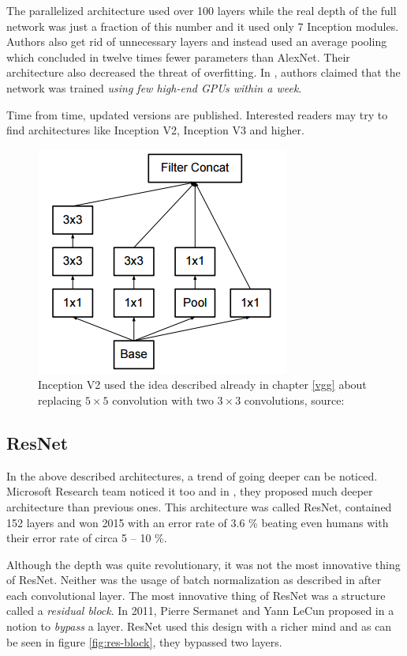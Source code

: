 The parallelized architecture used over 100 layers while the real depth of the full network was just a fraction of this number and it used only 7 Inception modules. Authors also get rid of unnecessary  layers and instead used an average pooling which concluded in twelve times fewer parameters than AlexNet. Their architecture also decreased the threat of overfitting. In \cite{googlenet}, authors claimed that the network was trained \textit{using few high-end GPUs within a week}.

Time from time, updated versions are published. Interested readers may try to find architectures like Inception V2, Inception V3 and higher.

\begin{figure}[H]
   \centering
	\includegraphics[width=0.3\linewidth]{./pictures/inception-v2.png}
	\caption[Inception V2]{Inception V2 used the idea described already in chapter \ref{vgg} about replacing $5 \times 5$ convolution with two $3 \times 3$ convolutions, source: \cite{inception-v2}}
      \label{fig:inception-v2}
\end{figure}


\subsection{ResNet}
\label{resnet}

In the above described architectures, a trend of going deeper can be noticed. Microsoft Research team noticed it too and in \cite{resnet}, they proposed much deeper architecture than previous ones. This architecture was called ResNet, contained 152 layers and won  2015 with an error rate of 3.6 \% beating even humans with their error rate of circa 5 -- 10 \%.

Although the depth was quite revolutionary, it was not the most innovative thing of ResNet. Neither was the usage of batch normalization as described in \cite{batch-norm} after each convolutional layer. The most innovative thing of ResNet was a structure called a \textit{residual block}. In 2011, Pierre Sermanet and Yann LeCun proposed in \cite{bypass} a notion to \textit{bypass} a layer. ResNet used this design with a richer mind and as can be seen in figure \ref{fig:res-block}, they bypassed two layers.

